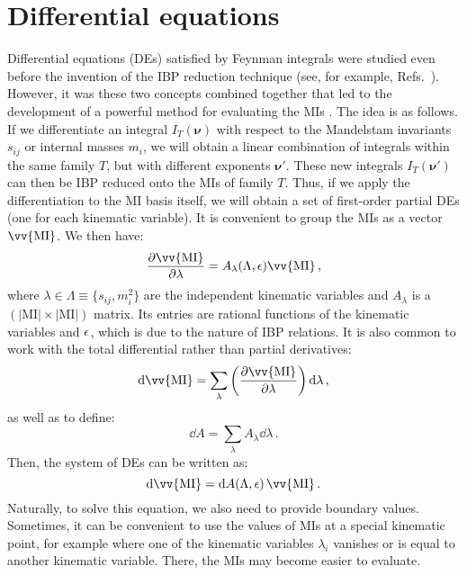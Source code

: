 \documentclass[main.tex]{subfiles}
\begin{document}
\section{Differential equations} \label{sec:DEs}
Differential equations (DEs) satisfied by Feynman integrals were studied even before the invention of the IBP reduction technique (see, for example, Refs.~\cite{Barucchi:1973zm, Golubeva:1976}). However, it was these two concepts combined together that led to the development of a powerful method for evaluating the MIs \cite{Kotikov:1990kg, Kotikov:1991314, Bern:1993kr, Remiddi:1997ny, Gehrmann:1999as}. The idea is as follows. If we differentiate an integral $I_T(\bm{\nu})$ with respect to the Mandelstam invariants $s_{ij}$ or internal masses $m_i$, we will obtain a linear combination of integrals within the same family $T$, but with different exponents $\bm{\nu}'$. These new integrals $I_T(\bm{\nu}')$ can then be IBP reduced onto the MIs of family $T$. Thus, if we apply the differentiation to the MI basis itself, we will obtain a set of first-order partial DEs (one for each kinematic variable). It is convenient to group the MIs as a vector $\vv{\text{MI}}$. We then have:
\begin{equation} \label{eq:DEspartial}
    \frac{\partial \vv{\text{MI}}}{\partial \lambda} = A_{\lambda}(\Lambda, \eps) \vv{\text{MI}}\,,
\end{equation}
where $\lambda \in \Lambda \equiv \{s_{ij}, m_i^2\}$ are the independent kinematic variables and $A_\lambda$ is a $\left(|\text{MI}| \times |\text{MI}|\right)$ matrix. Its entries are rational functions of the kinematic variables and $\epsilon$, which is due to the nature of IBP relations. It is also common to work with the total differential rather than partial derivatives:
\begin{equation}
    \dd \vv{\text{MI}} = \sum_{\lambda} \left(\frac{\partial \vv{\text{MI}}}{\partial \lambda} \right) \dd \lambda\,,
\end{equation}
as well as to define:
\begin{equation}
    \dd A = \sum_\lambda A_\lambda \dd\lambda\,.
\end{equation}
Then, the system of DEs can be written as:
\begin{equation} \label{eq:DEsoneform}
    \dd \vv{\text{MI}} = \dd A(\Lambda, \eps) \,\vv{\text{MI}}\,.
\end{equation}
Naturally, to solve this equation, we also need to provide boundary values. Sometimes, it can be convenient to use the values of MIs at a special kinematic point, for example where one of the kinematic variables $\lambda_i$ vanishes or is equal to another kinematic variable. There, the MIs may become easier to evaluate. 
\end{document}
